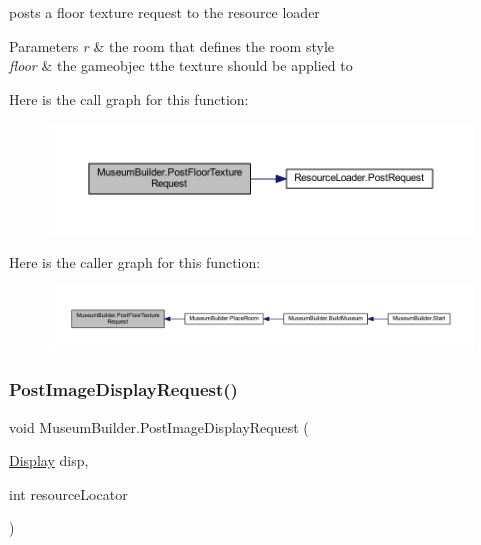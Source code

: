 posts a floor texture request to the resource loader 


\begin{DoxyParams}{Parameters}
{\em r} & the room that defines the room style\\
\hline
{\em floor} & the gameobjec tthe texture should be applied to\\
\hline
\end{DoxyParams}
Here is the call graph for this function\+:
\nopagebreak
\begin{figure}[H]
\begin{center}
\leavevmode
\includegraphics[width=350pt]{class_museum_builder_a18b0a6f67d3e9053b604c5a7caf9d4b0_cgraph}
\end{center}
\end{figure}
Here is the caller graph for this function\+:
\nopagebreak
\begin{figure}[H]
\begin{center}
\leavevmode
\includegraphics[width=350pt]{class_museum_builder_a18b0a6f67d3e9053b604c5a7caf9d4b0_icgraph}
\end{center}
\end{figure}
\mbox{\label{class_museum_builder_a4d5a59830643d185fbda5b11a251ffc3}} 
\subsubsection{\texorpdfstring{Post\+Image\+Display\+Request()}{PostImageDisplayRequest()}}
{\footnotesize\ttfamily void Museum\+Builder.\+Post\+Image\+Display\+Request (\begin{DoxyParamCaption}\item[{\mbox{\hyperlink{class_display}{Display}}}]{disp,  }\item[{int}]{resource\+Locator }\end{DoxyParamCaption})\hspace{0.3cm}{\ttfamily [private]}}



